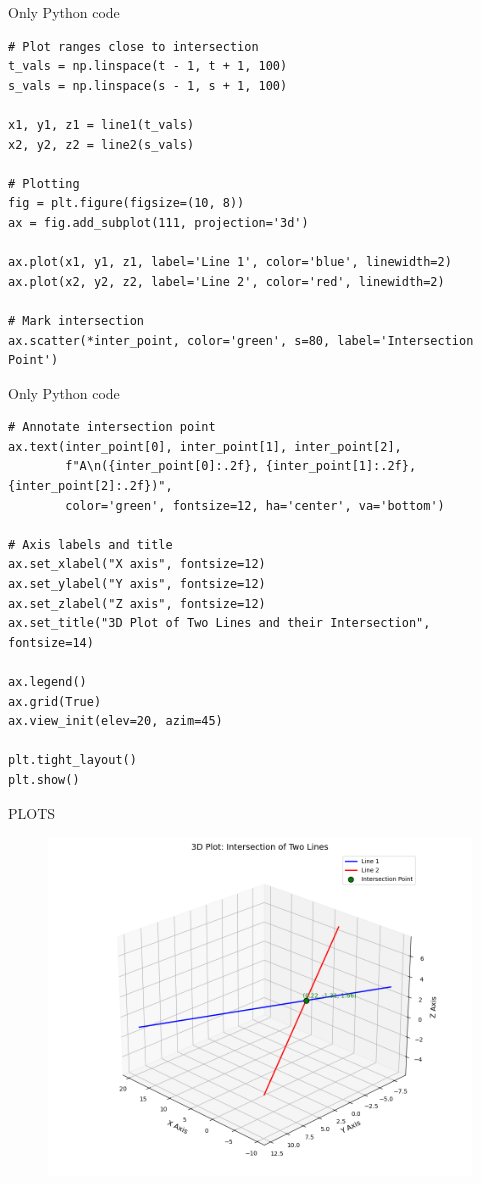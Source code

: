 \documentclass{beamer}
\begin{document}
  \begin{frame}[fragile]{Only Python code}
\begin{lstlisting}
# Plot ranges close to intersection
t_vals = np.linspace(t - 1, t + 1, 100)
s_vals = np.linspace(s - 1, s + 1, 100)

x1, y1, z1 = line1(t_vals)
x2, y2, z2 = line2(s_vals)

# Plotting
fig = plt.figure(figsize=(10, 8))
ax = fig.add_subplot(111, projection='3d')

ax.plot(x1, y1, z1, label='Line 1', color='blue', linewidth=2)
ax.plot(x2, y2, z2, label='Line 2', color='red', linewidth=2)

# Mark intersection
ax.scatter(*inter_point, color='green', s=80, label='Intersection Point')
 \end{lstlisting}
\end{frame}
  \begin{frame}[fragile]{Only Python code}
\begin{lstlisting}
# Annotate intersection point
ax.text(inter_point[0], inter_point[1], inter_point[2],
        f"A\n({inter_point[0]:.2f}, {inter_point[1]:.2f}, {inter_point[2]:.2f})",
        color='green', fontsize=12, ha='center', va='bottom')

# Axis labels and title
ax.set_xlabel("X axis", fontsize=12)
ax.set_ylabel("Y axis", fontsize=12)
ax.set_zlabel("Z axis", fontsize=12)
ax.set_title("3D Plot of Two Lines and their Intersection", fontsize=14)

ax.legend()
ax.grid(True)
ax.view_init(elev=20, azim=45)

plt.tight_layout()
plt.show()

 \end{lstlisting}
\end{frame}
\begin{frame}{PLOTS}
    \begin{figure}
        \centering
        \includegraphics[width=0.9\columnwidth]{figs/fig71.png}
        \caption{}
        \label{fig:placeholder}
    \end{figure}
\end{frame}
\end{document}
